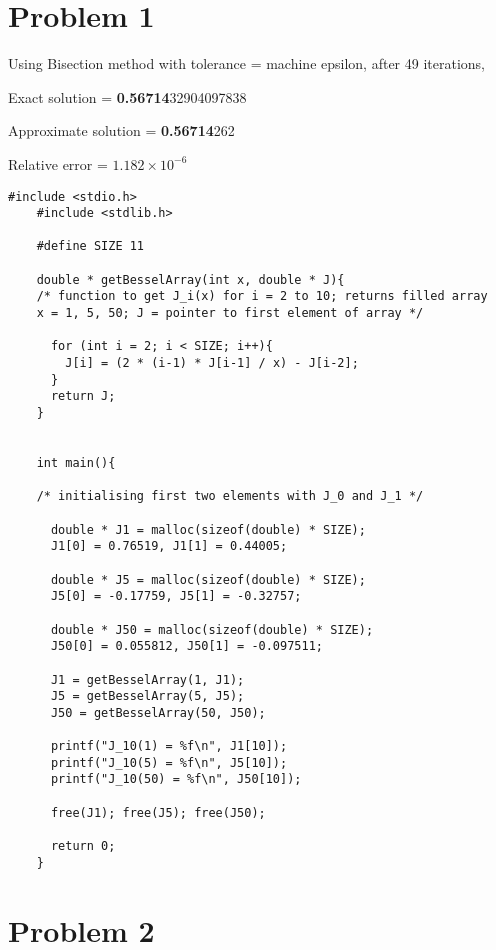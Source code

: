\documentclass[12pt,letterpaper]{article}
\begin{document}
\section*{Problem 1}

Using Bisection method with tolerance = machine epsilon, after 49 iterations,

Exact solution = \textbf{0.56714}32904097838

Approximate solution = \textbf{0.56714}262

Relative error = $1.182 \times 10^{-6}$



    \lstset{language=C++}
    \begin{lstlisting}[style = C]
	#include <stdio.h>
	#include <stdlib.h>
	
	#define SIZE 11
	
	double * getBesselArray(int x, double * J){
	/* function to get J_i(x) for i = 2 to 10; returns filled array
	x = 1, 5, 50; J = pointer to first element of array */

	  for (int i = 2; i < SIZE; i++){
	    J[i] = (2 * (i-1) * J[i-1] / x) - J[i-2];
	  }
	  return J;
	}
	
	
	int main(){
	
	/* initialising first two elements with J_0 and J_1 */
	
	  double * J1 = malloc(sizeof(double) * SIZE);
	  J1[0] = 0.76519, J1[1] = 0.44005;
	
	  double * J5 = malloc(sizeof(double) * SIZE);
	  J5[0] = -0.17759, J5[1] = -0.32757;
	
	  double * J50 = malloc(sizeof(double) * SIZE);
	  J50[0] = 0.055812, J50[1] = -0.097511;
	
	  J1 = getBesselArray(1, J1);
	  J5 = getBesselArray(5, J5);
	  J50 = getBesselArray(50, J50);
	
	  printf("J_10(1) = %f\n", J1[10]);
	  printf("J_10(5) = %f\n", J5[10]);
	  printf("J_10(50) = %f\n", J50[10]);
	
	  free(J1); free(J5); free(J50);
	
	  return 0;
	}

    \end{lstlisting}

\newpage

\section*{Problem 2}
\end{document}
